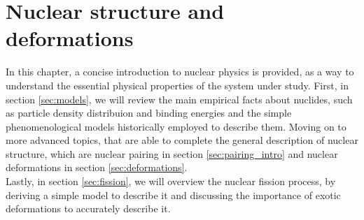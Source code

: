 \chapter{Nuclear structure and deformations}
In this chapter, a concise introduction to nuclear physics is provided, as a way to understand the essential physical properties of the system under study.
First, in section \ref{sec:models}, we will review the main empirical facts about nuclides, such as particle density distribuion and binding energies and the  simple phenomenological models historically employed to describe them. Moving on to more advanced topics, that are able to complete the general description of nuclear structure, which are nuclear pairing in section \ref{sec:pairing_intro} and nuclear deformations in section \ref{sec:deformations}.
\\Lastly, in section \ref{sec:fission}, we will overview the nuclear fission process, by deriving a simple model to describe it and discussing the importance of exotic deformations to accurately describe it.
\label{chap:intro}



